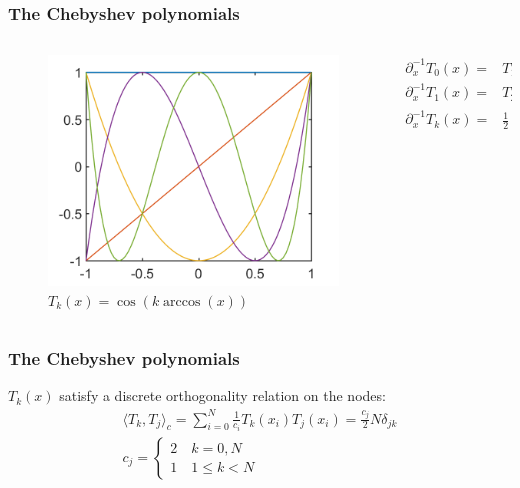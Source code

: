 \documentclass[handout]{beamer}
\begin{document}
\begin{frame}
\frametitle{The Chebyshev polynomials}

\begin{columns}

\begin{column}{0.4\textwidth}
\begin{figure}
\includegraphics[width=\textwidth]{ChebPoly.png}
\caption{$T_k(x) = \cos \left ( k \arccos (x) \right )$}
\end{figure}
\end{column}

\begin{column}{0.6\textwidth}
\begin{align*}
 \partial_x^{-1} T_0(x) = & T_1(x) \\
 \partial_x^{-1} T_1(x) = & T_2(x) / 4 \\
 \partial_x^{-1}T_k(x) = & \frac{1}{2} \left ( \frac{T_{k+1}(x)}{k+1} - \frac{T_{k-1}(x)}{k-1} \right ).
\end{align*}
\end{column}

\end{columns}
\end{frame}

\begin{frame}
\frametitle{The Chebyshev polynomials}
$T_k(x)$ satisfy a discrete orthogonality relation on the nodes:
\begin{equation*}
\begin{gathered}
\langle T_k,T_j \rangle_c = 
\sum_{i=0}^{N} \frac{1}{c_i} T_k(x_i) T_j(x_i) = \frac{c_j}{2} N \delta_{jk} \\
c_j = \begin{cases} 2 \quad k = 0, N \\ 1 \quad 1 \leq k < N \end{cases}
\end{gathered}
\end{equation*}
\end{frame}
\end{document}
